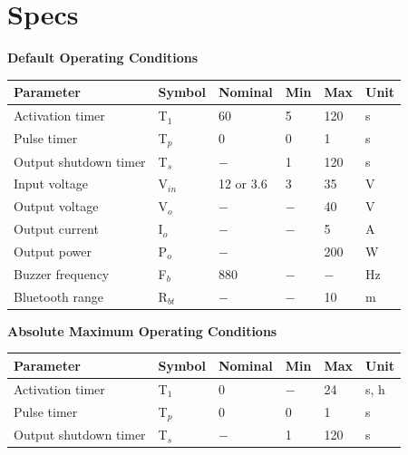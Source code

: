 \documentclass{article}
\begin{document}
\section{Specs}
\begin{center}
	\textbf{Default Operating Conditions}\\
	\begin{tabular}{ |p{5cm}||p{1.5cm}|p{1.5cm}|p{1cm}|p{1cm}|p{2cm}|}
		\hline
		\textbf{Parameter}&\textbf{Symbol}&\textbf{Nominal}&\textbf{Min}&\textbf{Max}&\textbf{Unit}\\
		\hline\hline
		Activation timer						&	T$_1$	&	60	&	5	&	120	&	s	\\
		Pulse timer\footnotemark[1]				&	T$_p$	&	0	&	0	&	1	&	s	\\
		Output shutdown timer\footnotemark[1]	&	T$_s$	&	$-$	&	1	&	120	&	s	\\
		\hline
		Input voltage		&	V$_{in}$&12 or 3.6&	3	&	35	&	V	\\
		Output voltage		& 	V$_o$	&	$-$	&	$-$	&	40	&	V	\\
		Output current		&	I$_o$	&	$-$	&	$-$	&	5	&	A	\\
		Output power		&	P$_o$	&	$-$	&		&	200	&	W	\\
		\hline
		Buzzer frequency	&	F$_b$	&	880	&	$-$	&	$-$	&	Hz	\\
		Bluetooth range 	&	R$_{bt}$&	$-$	&	$-$	&	10	&	m	\\

		\hline
	\end{tabular}
	\newline\newline\newline
	\textbf{Absolute Maximum Operating Conditions}\\
	\begin{tabular}{ |p{5cm}||p{1.5cm}|p{1.5cm}|p{1cm}|p{1cm}|p{2cm}|}
		\hline
		\textbf{Parameter}&\textbf{Symbol}&\textbf{Nominal}&\textbf{Min}&\textbf{Max}&\textbf{Unit}\\
		\hline\hline
		Activation timer\footnotemark[2]	&	T$_1$	&	0	&	$-$	&	24	&	s, h	\\
		Pulse timer\footnotemark[1]\footnotemark[2]				&	T$_p$	&	0	&	0	&	1	&	s	\\
		Output shutdown timer\footnotemark[1]\footnotemark[2]	&	T$_s$	&	$-$	&	1	&	120	&	s	\\

		\hline
	\end{tabular}
\end{center}
\end{document}
